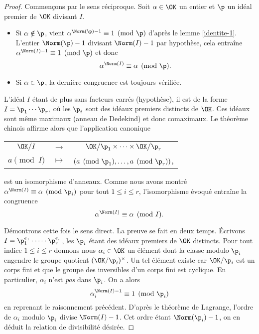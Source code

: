 \begin{proof}
	Commençons par le sens réciproque. Soit $\alpha\in \OK$ un entier et $\p$ un idéal premier de $\OK$ divisant $I$.
	\begin{itemize}
		\item Si $\alpha \notin \p$, vient $\alpha^{\Norm(\p) - 1} \equiv 1 \pmod{\p}$ d'après le lemme \ref{identite-1}. L'entier $\Norm(\p) - 1$ divisant $\Norm(I) - 1$ par hypothèse, cela entraîne $\alpha^{\Norm(I)-1}\equiv 1 \pmod{\p}$ et donc \[\alpha^{\Norm(I)} \equiv \alpha \pmod{\p}.\]
		\item Si $\alpha\in \p$, la dernière congruence est toujours vérifiée.
	\end{itemize}
	L'idéal $I$ étant de plus sans facteurs carrés (hypothèse), il est de la forme $I = \p_1 \cdots \p_r,$ où les $\p_i$ sont des idéaux premiers distincts de $\OK$. Ces idéaux sont même maximaux (anneau de Dedekind) et donc comaximaux. Le théorème chinois affirme alors que l'application canonique
\begin{center}
	\begin{tabular}{ccc}
		$\OK \big/I$ & $\longrightarrow$ & $\OK\big/\p_1\times \dots \times \OK\big/ \p_r$ \\
		$a\pmod{I} $	& $\longmapsto$ & $\left(a\pmod{\p_1} , \dots, a\pmod{\p_r}\right)$,
	\end{tabular}
\end{center}
est un isomorphisme d'anneaux. Comme nous avons montré $\alpha^{\Norm(I)} \equiv \alpha \pmod{\p_i}$ pour tout $1\leq i \leq r$, l'isomorphisme évoqué entraîne la congruence \[\alpha^{\Norm(I)} \equiv \alpha \pmod{I}.\]

	Démontrons cette fois le sens direct. La preuve se fait en deux temps. Écrivons $I = \p_1^{e_1} \cdot \dots \cdot \p_r^{e_r}$, les $\p_i$ étant des idéaux premiers de $\OK$ distincts. Pour tout indice $1\leqslant i \leqslant r$ donnons nous $\alpha_i\in \OK$ un élément dont la classe modulo $\p_i$ engendre le groupe quotient $(\OK/\p_i)^\times$. Un tel élément existe car $\OK/\p_i$ est un corps fini et que le groupe des inversibles d'un corps fini est cyclique. En particulier, $\alpha_i$ n'est \emph{pas} dans $\p_i$. On a alors \[\alpha_i^{\Norm(I) - 1} \equiv 1 \pmod{\p_i}\] en reprenant le raisonnement précédent. D'après le théorème de Lagrange, l'ordre de $\alpha_i$ modulo $\p_i$ divise $\Norm(I) - 1$. Cet ordre étant $\Norm(\p_i) - 1$, on en déduit la relation de divisibilité désirée.


\end{proof}

